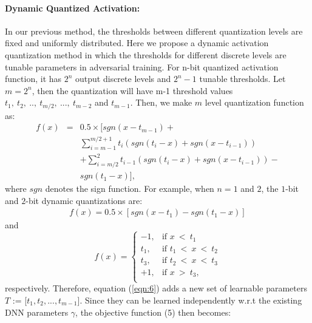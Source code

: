 \documentclass{article}
\begin{document}
\paragraph{Dynamic Quantized Activation:}
In our previous method, the thresholds between different quantization levels are fixed and uniformly distributed. Here we propose a dynamic activation quantization method in which the thresholds for different discrete levels are tunable parameters in adversarial training. 
For n-bit quantized activation function, it has $2^n$ output discrete levels and $2^n-1$ tunable thresholds. Let $m=2^n$, then the quantization will have m-1 threshold values $t_1,\ t_2,\ ..,\ t_{m/2},\ ...,\ t_{m-2}$ and $ t_{m-1}$. Then, we make $m$ level quantization function as:
\begin{eqnarray}
\label{eqn:6}
f(x)&=&0.5\times[sgn(x-t_{m-1})+ \nonumber\\
&&\sum_{i=m-1}^{m/2+1} t_i(sgn(t_i-x)+sgn(x-t_{i-1}))\nonumber\\
&&+\sum_{i=m/2}^{2} t_{i-1}(sgn(t_i-x)\nonumber
+sgn(x-t_{i-1}))-\nonumber\\
&&sgn(t_1-x)], 
\end{eqnarray}
where $sgn$ denotes the sign function. For example, when $n=1$ and $2$, the $1$-bit and $2$-bit dynamic quantizations are: 
\begin{align*}
f(x)=0.5\times[sgn(x-t_1)-sgn(t_1-x)]
\end{align*}
and
\begin{equation}{f(x)}=
\begin{cases}
    -1,& \text{if } x \ < \ t_1\\
    t_1,& \text{if } t_1\ < \ x \ < \ t_2\\
    t_3,& \text{if } t_2\ <\ x \ < \ t_3\\ 
    +1,& \text{if } x \ > \ t_3,\\ 
\end{cases}
\end{equation}
respectively. Therefore, equation (\ref{eqn:6}) adds a new set of learnable parameters $T$ := [$t_1,t_2,...,t_{m-1}$]. Since they can be learned independently w.r.t the existing DNN parameters $\gamma$, the objective function (5) then becomes:
\end{document}
